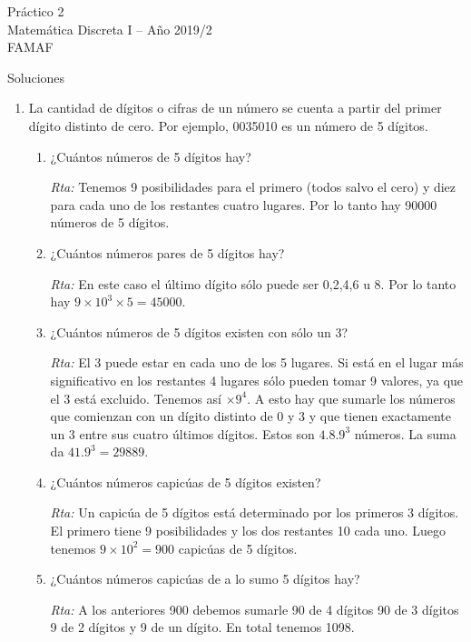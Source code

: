 \documentclass[12pt,spanish,makeidx]{amsbook}
\begin{document}
	
{\bf \begin{center} Práctico 2 \\ Matemática Discreta I -- Año 2019/2 \\ FAMAF \end{center}}

{\bf \begin{center} Soluciones \end{center}}

\begin{enumerate}
\item  La cantidad de dígitos o cifras de un número se cuenta a partir del primer dígito
distinto de cero. Por ejemplo, 0035010 es un número de 5 dígitos.
\begin{enumerate}
\item ¿Cuántos números de 5 dígitos hay?

\textit{Rta:} Tenemos 9 posibilidades para el primero (todos salvo el cero) y diez para cada uno de los restantes cuatro lugares. Por lo tanto hay 90000 números de 5 dígitos.

\item ¿Cuántos números pares de 5 dígitos hay?

\textit{Rta:} En este caso el último dígito sólo puede ser 0,2,4,6 u 8. Por lo tanto hay $9\times 10^3\times 5= 45000$.

\item ¿Cuántos números de 5 dígitos existen con sólo un 3?

\noindent\textit{Rta:} El 3 puede estar en cada uno de los 5 lugares. Si está en el lugar más significativo en los restantes 4 lugares sólo pueden tomar 9 valores, ya que el 3 está excluido. Tenemos así $\times 9^4.$ A esto hay que sumarle los números que comienzan con un dígito distinto de 0 y 3 y que tienen exactamente un 3 entre sus cuatro últimos dígitos. Estos son $4.8.9^3$ números. La suma da $41.9^3=29889$.

\item ¿Cuántos números capicúas de 5 dígitos existen?

\textit{Rta:} Un capicúa de 5 dígitos está determinado por los primeros 3 dígitos. El primero tiene 9 posibilidades y los dos restantes 10 cada uno. Luego tenemos $9\times 10^2=900 $ capicúas de 5 dígitos.

\item ¿Cuántos números capicúas de a lo sumo 5 dígitos hay?

\textit{Rta:} A los anteriores 900 debemos sumarle 90 de 4 dígitos 90 de 3 dígitos 9 de 2 dígitos y 9 de un dígito. En total tenemos 1098.
 

\end{enumerate}
\end{enumerate}
\end{document}
